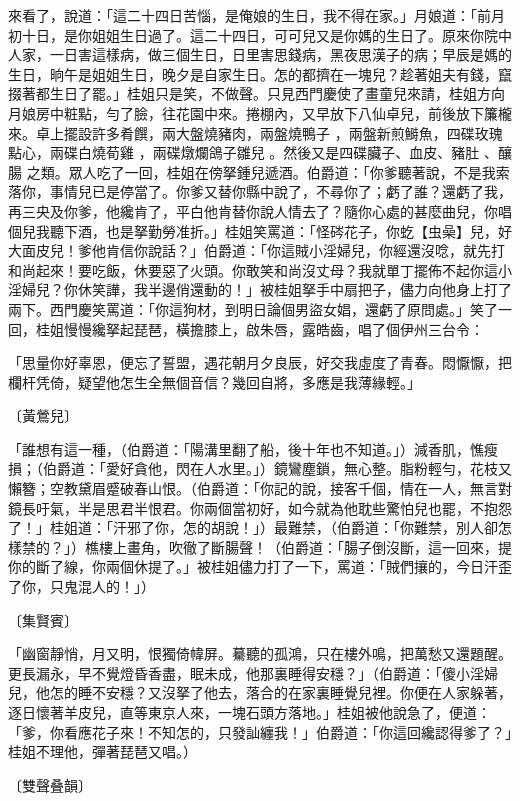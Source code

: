 \begin{showcontents}{}
來看了，說道：「這二十四日苦惱，是俺娘的生日，我不得在家。」月娘道：「前月初十日，是你姐姐生日過了。這二十四日，可可兒又是你媽的生日了。原來你院中人家，一日害這樣病，做三個生日，日里害思錢病，黑夜思漢子的病；早辰是媽的生日，晌午是姐姐生日，晚夕是自家生日。怎的都擠在一塊兒？趁著姐夫有錢，竄掇著都生日了罷。」桂姐只是笑，不做聲。只見西門慶使了畫童兒來請，桂姐方向月娘房中粧點，勻了臉，往花園中來。捲棚內，又早放下八仙卓兒，前後放下簾櫳來。卓上擺設許多肴饌，兩大盤燒豬肉，兩盤燒鴨子 ，兩盤新煎鰣魚，四碟玫瑰點心，兩碟白燒荀雞 ，兩碟燉爛鴿子雛兒 。然後又是四碟臟子、血皮、豬肚 、釀腸 之類。眾人吃了一回，桂姐在傍拏鍾兒遞酒。伯爵道：「你爹聽著說，不是我索落你，事情兒已是停當了。你爹又替你縣中說了，不尋你了；虧了誰？還虧了我，再三央及你爹，他纔肯了，平白他肯替你說人情去了？隨你心處的甚麼曲兒，你唱個兒我聽下酒，也是拏勤勞准折。」桂姐笑罵道：「怪硶花子，你虼【虫喿】兒，好大面皮兒！爹他肯信你說話？」伯爵道：「你這賊小淫婦兒，你經還沒唸，就先打和尚起來！要吃飯，休要惡了火頭。你敢笑和尚沒丈母？我就單丁擺佈不起你這小淫婦兒？你休笑譁，我半邊俏還動的！」被桂姐拏手中扇把子，儘力向他身上打了兩下。西門慶笑罵道：「你這狗材，到明日論個男盜女娼，還虧了原問處。」笑了一回，桂姐慢慢纔拏起琵琶，橫擔膝上，啟朱唇，露皓齒，唱了個伊州三台令：

「思量你好辜恩，便忘了誓盟，遇花朝月夕良辰，好交我虛度了青春。悶懨懨，把欄杆凭倚，疑望他怎生全無個音信？幾回自將，多應是我薄緣輕。」

〔黃鶯兒〕

「誰想有這一種，（伯爵道：「陽溝里翻了船，後十年也不知道。」）減香肌，憔瘦損；（伯爵道：「愛好貪他，閃在人水里。」）鏡鸞塵鎖，無心整。脂粉輕勻，花枝又懶簪；空教黛眉蹙破春山恨。（伯爵道：「你記的說，接客千個，情在一人，無言對鏡長吁氣，半是思君半恨君。你兩個當初好，如今就為他耽些驚怕兒也罷，不抱怨了！」桂姐道：「汗邪了你，怎的胡說！」）最難禁，（伯爵道：「你難禁，別人卻怎樣禁的？」）樵樓上畫角，吹徹了斷腸聲！（伯爵道：「腸子倒沒斷，這一回來，提你的斷了線，你兩個休提了。」被桂姐儘力打了一下，罵道：「賊們攘的，今日汗歪了你，只鬼混人的！」）

〔集賢賓〕

「幽窗靜悄，月又明，恨獨倚幃屏。驀聽的孤鴻，只在樓外鳴，把萬愁又還題醒。更長漏永，早不覺燈昏香盡，眠未成，他那裏睡得安穩？」（伯爵道：「傻小淫婦兒，他怎的睡不安穩？又沒拏了他去，落合的在家裏睡覺兒裡。你便在人家躲著，逐日懷著羊皮兒，直等東京人來，一塊石頭方落地。」桂姐被他說急了，便道：「爹，你看應花子來！不知怎的，只發訕纏我！」伯爵道：「你這回纔認得爹了？」桂姐不理他，彈著琵琶又唱。）

〔雙聲叠韻〕


\end{showcontents}
